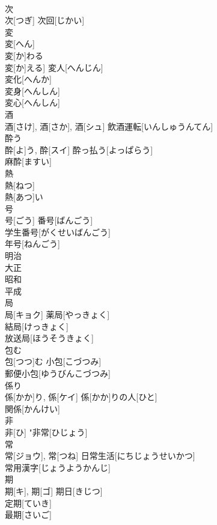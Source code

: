 \documentclass[8pt]{extreport}
\begin{document}
\begin{CJK}{UTF8}{min}
\\	次	
\\	次[つぎ]	次回[じかい] 
\\	変	
\\	変[へん] 
\\	変[か]わる 
\\	変[か]える]	変人[へんじん] 
\\	変化[へんか] 
\\	変身[へんしん] 
\\	変心[へんしん] 
\\	酒	
\\	酒[さけ], 酒[さか], 酒[シュ]	飲酒運転[いんしゅうんてん] 
\\	酔う	
\\	酔[よ]う, 酔[スイ]	酔っ払う[よっぱらう] 
\\	麻酔[ますい] 
\\	熱	
\\	熱[ねつ] 
\\	熱[あつ]い	
\\	号	
\\	号[ごう]	番号[ばんごう] 
\\	学生番号[がくせいばんごう] 
\\	年号[ねんごう] 
\\	明治 
\\	大正 
\\	昭和 
\\	平成 
\\	局	
\\	局[キョク]	薬局[やっきょく] 
\\	結局[けっきょく] 
\\	放送局[ほうそうきょく] 
\\	包む	
\\	包[つつ]む	小包[こづつみ] 
\\	郵便小包[ゆうびんこづつみ] 
\\	係り	
\\	係[かか]り, 係[ケイ]	係[かか]りの人[ひと] 
\\	関係[かんけい] 
\\	非	
\\	非[ひ]	"非常[ひじょう] 
\\	常	
\\	常[ジョウ], 常[つね]	日常生活[にちじょうせいかつ] 
\\	常用漢字[じょうようかんじ] 
\\	期	
\\	期[キ], 期[ゴ]	期日[きじつ] 
\\	定期[ていき] 
\\	最期[さいご] 

\end{CJK}
\end{document}
